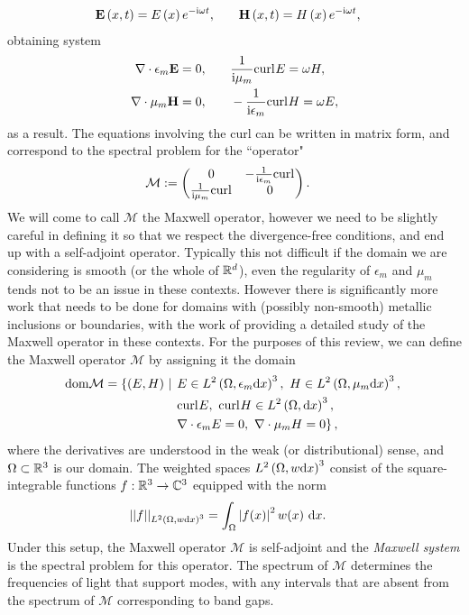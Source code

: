 \begin{align*}
	\mathbf{E}\left( x,t \right) = E\left( x \right)e^{-\mathrm{i}\omega t},
	&\qquad \mathbf{H}\left( x,t \right) = H\left( x \right)e^{-\mathrm{i}\omega t},
\end{align*}
obtaining system
\begin{align*}
	\nabla\cdot \epsilon_m \mathbf{E} = 0,
	&\qquad \frac{1}{\mathrm{i}\mu_m}\mathrm{curl}_{}E = \omega H, \\ 
	\nabla\cdot \mu_m \mathbf{H} = 0,
	&\qquad -\frac{1}{\mathrm{i}\epsilon_m}\mathrm{curl}_{}H = \omega E,
\end{align*}
as a result.
The equations involving the curl can be written in matrix form, and correspond to the spectral problem for the ``operator" 
\begin{align} \label{eq:Intro-MaxwellInMatrxForm}
	\mathcal{M} &:=
	\begin{pmatrix}
		0 & -\frac{1}{\mathrm{i}\epsilon_m}\mathrm{curl}_{} \\
		\frac{1}{\mathrm{i}\mu_m}\mathrm{curl}_{} & 0
	\end{pmatrix}.
\end{align}
We will come to call $\mathcal{M}$ the Maxwell operator, however we need to be slightly careful in defining it so that we respect the divergence-free conditions, and end up with a self-adjoint operator.
Typically this not difficult if the domain we are considering is smooth (or the whole of $\mathbb{R}^d$), even the regularity of $\epsilon_m$ and $\mu_m$ tends not to be an issue in these contexts.
However there is significantly more work that needs to be done for domains with (possibly non-smooth) metallic inclusions or boundaries, with the work of \cite{birman1987l2, birman1989selfadjoint} providing a detailed study of the Maxwell operator in these contexts.
For the purposes of this review, we can define the Maxwell operator $\mathcal{M}$ by assigning it the domain
\begin{align*}
	\mathrm{dom}{\mathcal{M}} = \left\{ \left( E,H \right) \ \middle\vert \right. 
	&
	\left. E\in L^2\left( \Omega, \epsilon_m\mathrm{d} x \right)^3, \ H\in L^2\left( \Omega, \mu_m\mathrm{d} x \right)^3, \right. \\
	&
	\left. \mathrm{curl}_{}E, \ \mathrm{curl}_{}H\in L^{2}\left( \Omega,\mathrm{d} x \right)^3, \right. \\
	&
	\left. \nabla\cdot \epsilon_m E = 0, \ \nabla\cdot \mu_m H = 0 \right\},
\end{align*}
where the derivatives are understood in the weak (or distributional) sense, and $\Omega\subset\mathbb{R}^3$ is our domain.
The weighted spaces $L^2\left( \Omega, w\mathrm{d} x \right)^3$ consist of the square-integrable functions $f:\mathbb{R}^3\rightarrow\mathbb{C}^3$ equipped with the norm
\begin{align*}
	\lvert\lvert  f  \rvert\rvert_{L^2\left( \Omega, w\mathrm{d} x \right)^3} &= \int_{\Omega}\left\lvert f(x) \right\rvert^2 w(x) \ \mathrm{d}x.
\end{align*}
Under this setup, the Maxwell operator $\mathcal{M}$ is self-adjoint and the \emph{Maxwell system} is the spectral problem for this operator.
The spectrum of $\mathcal{M}$ determines the frequencies of light that support modes, with any intervals that are absent from the spectrum of $\mathcal{M}$ corresponding to band gaps.

